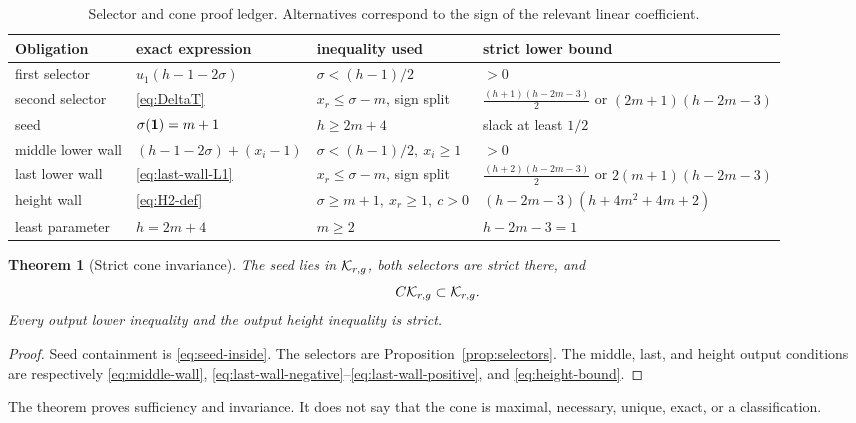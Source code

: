\documentclass[11pt]{article}
\newtheorem{theorem}{Theorem}[section]
\theoremstyle{remark}
\numberwithin{equation}{section}
\begin{document}
\begin{table}[ht]
\centering
\scriptsize
\caption{Selector and cone proof ledger.  Alternatives correspond to the
sign of the relevant linear coefficient.}
\label{tab:cone-ledger}
\begin{tabularx}{\textwidth}{@{}p{}X
p{}p{}@{}}
\toprule
Obligation & exact expression & inequality used & strict lower bound \\
\midrule
first selector & \(u_1(h-1-2\sigma)\) &
\(\sigma<(h-1)/2\) & \(>0\) \\
second selector & \eqref{eq:DeltaT} &
\(x_r\leq\sigma-m\), sign split &
\(\frac{(h+1)(h-2m-3)}2\) or
\((2m+1)(h-2m-3)\) \\
seed & \(\sigma(\mathbf{1})=m+1\) &
\(h\geq2m+4\) & slack at least \(1/2\) \\
middle lower wall &
\((h-1-2\sigma)+(x_i-1)\) &
\(\sigma<(h-1)/2,\ x_i\geq1\) & \(>0\) \\
last lower wall & \eqref{eq:last-wall-L1} &
\(x_r\leq\sigma-m\), sign split &
\(\frac{(h+2)(h-2m-3)}2\) or
\(2(m+1)(h-2m-3)\) \\
height wall & \eqref{eq:H2-def} &
\(\sigma\geq m+1,\ x_r\geq1,\ c>0\) &
\((h-2m-3)(h+4m^2+4m+2)\) \\
least parameter & \(h=2m+4\) & \(m\geq2\) &
\(h-2m-3=1\) \\
\bottomrule
\end{tabularx}
\end{table}

\begin{theorem}[Strict cone invariance]\label{thm:cone-invariance}
The seed lies in \(\mathcal{K}_{r,g}\), both selectors are strict there, and
\begin{equation}\label{eq:cone-invariance}
C\mathcal{K}_{r,g}\subset\mathcal{K}_{r,g}.
\end{equation}
Every output lower inequality and the output height inequality is strict.
\end{theorem}

\begin{proof}
Seed containment is \eqref{eq:seed-inside}.  The selectors are
Proposition~\ref{prop:selectors}.  The middle, last, and height output
conditions are respectively \eqref{eq:middle-wall},
\eqref{eq:last-wall-negative}--\eqref{eq:last-wall-positive}, and
\eqref{eq:height-bound}.
\end{proof}

The theorem proves sufficiency and invariance.  It does not say that the cone
is maximal, necessary, unique, exact, or a classification.
\end{document}

